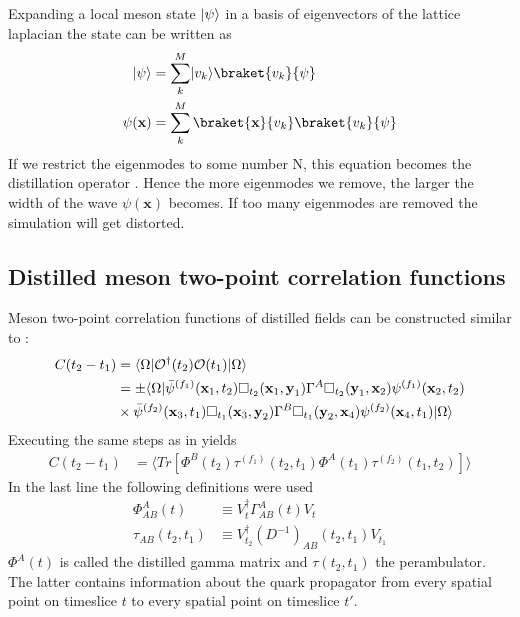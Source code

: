     Expanding a local meson state $\lvert\psi\rangle$ in a basis of eigenvectors of the lattice laplacian the state can be written as
    \begin{equation}
        \begin{aligned}
            \ket{\psi} &= \sum_k^M \ket{v_k}\braket{v_k}{\psi}\\
            \psi(\textbf{x}) &= \sum_k^M \braket{\textbf{x}}{v_k}\braket{v_k}{\psi}
        \end{aligned}
    \end{equation}
    If we restrict the eigenmodes to some number N, this equation becomes the distillation operator . Hence the more eigenmodes we remove, the larger the width of the wave $\psi(\textbf{x})$ becomes. If too many eigenmodes are removed the simulation will get distorted.
    
\subsection{Distilled meson two-point correlation functions}
    Meson two-point correlation functions of distilled fields can be constructed similar to :
    \begin{equation}
        \begin{aligned}
            C(t_2 - t_1) &= \langle\Omega| \mathcal{O}^\dagger(t_2) \mathcal{O}(t_1)|\Omega\rangle\\
            &= \pm\langle\Omega| \bar{\psi}^{(f_1)}(\textbf{x}_1,t_2)\Box_{t_2}(\textbf{x}_1,\textbf{y}_1)\Gamma^A
            \Box_{t_2}(\textbf{y}_1,\textbf{x}_2)\psi^{(f_1)}(\textbf{x}_2,t_2)\\
            &\times \bar{\psi}^{(f_2)}(\textbf{x}_3,t_1)\Box_{t_1}(\textbf{x}_3,\textbf{y}_2)\Gamma^B
            \Box_{t_1}(\textbf{y}_2,\textbf{x}_4)\psi^{(f_2)}(\textbf{x}_4,t_1) |\Omega\rangle
        \end{aligned}
    \end{equation}
    \noindent
    Executing the same steps as in  yields
    \begin{equation}
        \begin{aligned}
            C(t_2 - t_1) &= \langle Tr[\Phi^B(t_2)\tau^{(f_1)}(t_2,t_1)\Phi^A(t_1)\tau^{(f_2)}(t_1,t_2)] \rangle
        \end{aligned}
    \end{equation}
    In the last line the following definitions were used
    \begin{equation}
        \begin{aligned}\label{def_gamma_and_perambulator}
            \Phi_{AB}^A(t) &\equiv V_{t}^\dagger\Gamma_{AB}^A(t)V_t\\
            \tau_{AB}(t_2,t_1) &\equiv V_{t_2}^\dagger(D^{-1})_{AB}(t_2,t_1)V_{t_1}
        \end{aligned}
    \end{equation}
    $\Phi^A(t)$ is called the distilled gamma matrix and $\tau(t_2,t_1)$ the perambulator. The latter contains information about the quark propagator from every spatial point on timeslice $t$ to every spatial point on timeslice $t'$.
    

